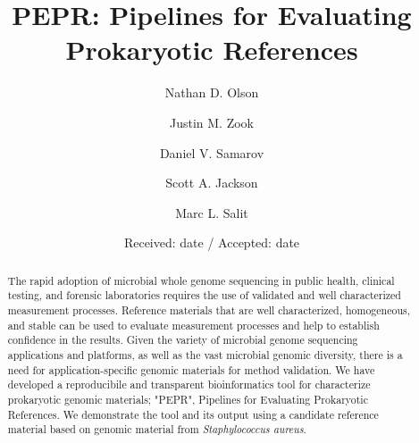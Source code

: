 \documentclass[smallextended]{svjour3}\usepackage[]{graphicx}\usepackage[]{color}
\begin{document}

\title{PEPR: Pipelines for Evaluating Prokaryotic References}


\author{Nathan D. Olson \and
        Justin M. Zook \and
        Daniel V. Samarov \and
        Scott A. Jackson \and
        Marc L. Salit
}



\date{Received: date / Accepted: date}


\maketitle



\begin{abstract}
The rapid adoption of microbial whole genome sequencing in public health, clinical testing, and forensic laboratories requires the use of validated and well characterized measurement processes. Reference materials that are well characterized, homogeneous, and stable can be used to evaluate measurement processes and help to establish confidence in the results. Given the variety of microbial genome sequencing applications and platforms, as well as the vast microbial genomic diversity, there is a need for application-specific genomic materials for method validation. We have developed a reproducibile and transparent bioinformatics tool for characterize prokaryotic genomic materials; "PEPR", Pipelines for Evaluating Prokaryotic References. We demonstrate the tool and its output using a candidate reference material based on genomic material from \textit{Staphylococcus aureus}.


\end{abstract}
\end{document}
